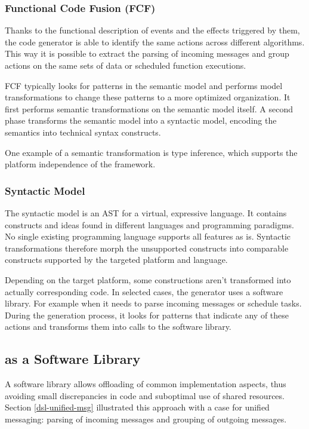 \documentclass[conference]{IEEEtran}
\begin{document}
\subsubsection{Functional Code Fusion (FCF)}

Thanks to the functional description of events and the effects triggered by
them, the code generator is able to identify the same actions across different
algorithms. This way it is possible to extract the parsing of incoming messages
and group actions on the same sets of data or scheduled function executions.

FCF typically looks for patterns in the semantic model and performs model
transformations to change these patterns to a more optimized organization. It
first performs semantic transformations on the semantic model itself. A second
phase transforms the semantic model into a syntactic model, encoding the
semantics into technical syntax constructs.

One example of a semantic transformation is type inference, which supports the
platform independence of the framework.

\subsubsection{Syntactic Model}

The syntactic model is an AST for a virtual, expressive language. It contains
constructs and ideas found in different languages and programming paradigms. No
single existing programming language supports all features as is. Syntactic
transformations therefore morph the unsupported constructs into comparable
constructs supported by the targeted platform and language.

Depending on the target platform, some constructions aren't transformed into
actually corresponding code. In selected cases, the generator uses a software
library. For example when it needs to parse incoming messages or schedule
tasks. During the generation process, it looks for patterns that indicate any
of these actions and transforms them into calls to the \NAME software library.

\subsection{\NAME as a Software Library}
\label{software-lib-design}

A software library allows offloading of common implementation aspects, thus
avoiding small discrepancies in code and suboptimal use of shared resources.
Section \ref{dsl-unified-msg} illustrated this approach with a case for unified
messaging: parsing of incoming messages and grouping of outgoing messages.
\end{document}
